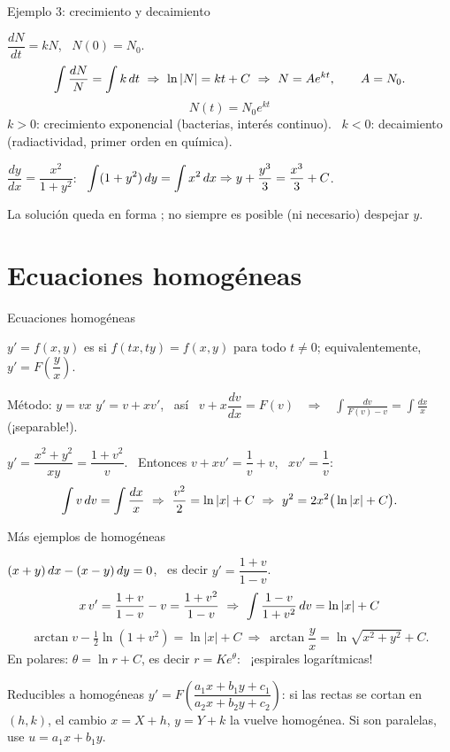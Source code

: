 \documentclass[10pt,aspectratio=169]{beamer}
\begin{document}
\begin{frame}{Ejemplo 3: crecimiento y decaimiento}
  \begin{ejemplo}
    $\dfrac{dN}{dt}=kN$, \ $N(0)=N_0$.
    \[ \int\frac{dN}{N}=\int k\dt\ \Rightarrow\ \ln|N|=kt+C\ \Rightarrow\ N=Ae^{kt},\qquad A=N_0. \]
    \[ \boxed{N(t)=N_0e^{kt}} \]
    $k>0$: crecimiento exponencial (bacterias, interés continuo). \ $k<0$: decaimiento (radiactividad, primer orden en química).
  \end{ejemplo}
  \begin{ejemplo}[4]
    $\dfrac{dy}{dx}=\dfrac{x^2}{1+y^2}$: \ $\displaystyle\int(1+y^2)\,dy=\int x^2\,dx\Rightarrow y+\frac{y^3}3=\frac{x^3}3+C$.
    \smallskip

    La solución queda en forma ; no siempre es posible (ni necesario) despejar $y$.
  \end{ejemplo}
\end{frame}

\section{Ecuaciones homogéneas}

\begin{frame}{Ecuaciones homogéneas}
  \begin{definicion}
    $y'=f(x,y)$ es  si $f(tx,ty)=f(x,y)$ para todo $t\neq0$; equivalentemente, $y'=F\!\left(\dfrac yx\right)$.
  \end{definicion}
  \begin{block}{Método: $y=vx$}
    $y'=v+xv'$, \ así \ $v+x\dfrac{dv}{dx}=F(v)$ \ $\Rightarrow$ \ $\displaystyle\int\frac{dv}{F(v)-v}=\int\frac{dx}x$ \quad (¡separable!).
  \end{block}
  \begin{ejemplo}[5]
    $y'=\dfrac{x^2+y^2}{xy}=\dfrac{1+v^2}{v}$. \ Entonces $v+xv'=\dfrac1v+v$, \ $xv'=\dfrac1v$:
    \[ \int v\dv=\int\frac{dx}x\ \Rightarrow\ \frac{v^2}2=\ln|x|+C\ \Rightarrow\ y^2=2x^2\big(\ln|x|+C\big). \]
  \end{ejemplo}
\end{frame}

\begin{frame}{Más ejemplos de homogéneas}
  \begin{ejemplo}[6]
    $(x+y)\,dx-(x-y)\,dy=0$, \ es decir $y'=\dfrac{1+v}{1-v}$.
    \[ x\,v'=\frac{1+v}{1-v}-v=\frac{1+v^2}{1-v}\ \Rightarrow\ \int\frac{1-v}{1+v^2}\dv=\ln|x|+C \]
    \[ \arctan v-\tfrac12\ln(1+v^2)=\ln|x|+C\ \Rightarrow\ \arctan\frac yx=\ln\sqrt{x^2+y^2}+C. \]
    En polares: $\theta=\ln r+C$, es decir $r=Ke^{\theta}$: \ ¡espirales logarítmicas!
  \end{ejemplo}
  \begin{block}{Reducibles a homogéneas}
    $y'=F\!\left(\dfrac{a_1x+b_1y+c_1}{a_2x+b_2y+c_2}\right)$: si las rectas se cortan en $(h,k)$, el cambio $x=X+h$, $y=Y+k$ la vuelve
    homogénea. Si son paralelas, use $u=a_1x+b_1y$.
  \end{block}
\end{frame}
\end{document}
